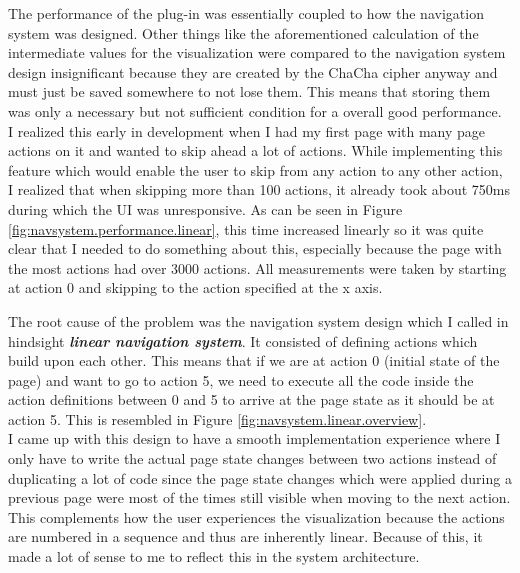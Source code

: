 The performance of the plug-in was essentially coupled to how the navigation system was designed. Other things like the aforementioned calculation of the intermediate values for the visualization were compared to the navigation system design insignificant because they are created by the ChaCha cipher anyway and must just be saved somewhere to not lose them. This means that storing them was only a necessary but not sufficient condition for a overall good performance. \\
I realized this early in development when I had my first page with many page actions on it and wanted to skip ahead a lot of actions. While implementing this feature which would enable the user to skip from any action to any other action, I realized that when skipping more than 100 actions, it already took about 750ms during which the UI was unresponsive. As can be seen in Figure \ref{fig:navsystem.performance.linear}, this time increased linearly so it was quite clear that I needed to do something about this, especially because the page with the most actions had over 3000 actions. All measurements were taken by starting at action 0 and skipping to the action specified at the x axis.

The root cause of the problem was the navigation system design which I called in hindsight \textbf{\textit{linear navigation system}}. It consisted of defining actions which build upon each other. This means that if we are at action 0 (initial state of the page) and want to go to action 5, we need to execute all the code inside the action definitions between 0 and 5 to arrive at the page state as it should be at action 5. This is resembled in Figure \ref{fig:navsystem.linear.overview}. \\
I came up with this design to have a smooth implementation experience where I only have to write the actual page state changes between two actions instead of duplicating a lot of code since the page state changes which were applied during a previous page were most of the times still visible when moving to the next action. This complements how the user experiences the visualization because the actions are numbered in a sequence and thus are inherently linear. Because of this, it made a lot of sense to me to reflect this in the system architecture.

